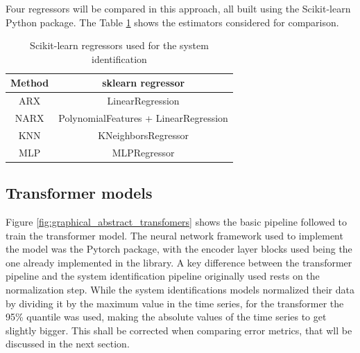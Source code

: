 \documentclass[conference]{IEEEtran}
\begin{document}
Four regressors will be compared in this approach, all built using the Scikit-learn \cite{sklearn_manual} Python package.
The Table \ref{tab:skl_regressors} shows the estimators considered for comparison.
\begin{table}[htbp]
    \caption{Scikit-learn regressors used for the system identification}
    \begin{center}
    \begin{tabular}{|c|c|}
    \hline
    \textbf{Method}&{\textbf{sklearn regressor}} \\
    \hline
    ARX  & LinearRegression  \\
    \hline
    NARX & PolynomialFeatures + LinearRegression   \\
    \hline
    KNN & KNeighborsRegressor   \\
    \hline
    MLP & MLPRegressor  \\
    \hline
    \end{tabular}
    \label{tab:skl_regressors}
    \end{center}
    \end{table}

\subsection{Transformer models}

Figure \ref{fig:graphical_abstract_transfomers} shows the basic pipeline followed
to train the transformer model. The neural network framework used to implement the 
model was the Pytorch package, with the encoder layer blocks used being the one already 
implemented in the library. A key difference between the transformer pipeline and the
system identification pipeline originally used rests on the normalization step. While 
the system identifications models normalized their data by dividing it by the maximum
value in the time series, for the transformer the 95\% quantile was used, making the absolute values
of the time series to get slightly bigger. This shall be corrected when comparing error
metrics, that wll be discussed in the next section.
\end{document}
